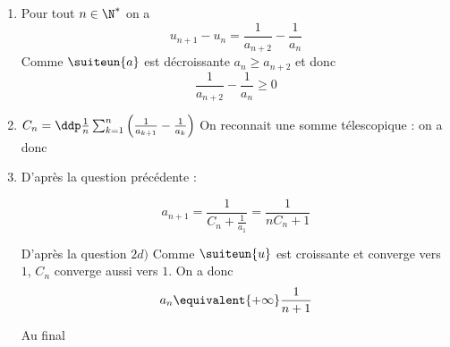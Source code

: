 \documentclass[a4paper, 11pt,reqno]{article}
\begin{document}
\begin{correction}
\begin{enumerate}
\begin{enumerate}
\item Pour tout $n\in \N^*$ on a $$u_{n+1}-u_n= \frac{1}{a_{n+2}}- \frac{1}{a_n}$$
Comme $\suiteun{a}$  est décroissante $a_n\geq a_{n+2}$ et donc 
$$\frac{1}{a_{n+2}}- \frac{1}{a_n}\geq  0$$


\item $C_n =\ddp \frac{1}{n }\sum_{k=1}^n \left(\frac{1}{a_{k+1}} -\frac{1}{a_k} \right)$
On reconnait une somme télescopique : on a donc 



\item D'après la question précédente : 

$$a_{n+1} = \frac{1}{C_n +\frac{1}{a_1}}= \frac{1}{nC_n +1}$$

D'après la question $2d)$ Comme $\suiteun{u}$ est croissante et converge  vers $1$, $C_n$ converge aussi vers $1$. 
On a donc $$a_n \equivalent{+\infty} \frac{1}{n+1}$$

Au final 

\end{enumerate}
\end{enumerate}
\end{correction}
\end{document}
